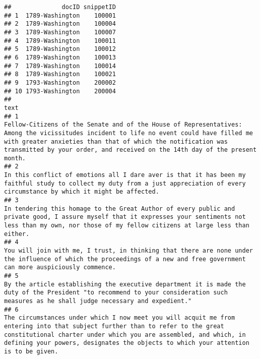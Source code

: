 \documentclass[]{article}
\begin{document}
\begin{verbatim}
##              docID snippetID
## 1  1789-Washington    100001
## 2  1789-Washington    100004
## 3  1789-Washington    100007
## 4  1789-Washington    100011
## 5  1789-Washington    100012
## 6  1789-Washington    100013
## 7  1789-Washington    100014
## 8  1789-Washington    100021
## 9  1793-Washington    200002
## 10 1793-Washington    200004
##                                                                                                                                                                                                                                                                                                                                                           text
## 1                                                                       Fellow-Citizens of the Senate and of the House of Representatives:  Among the vicissitudes incident to life no event could have filled me with greater anxieties than that of which the notification was transmitted by your order, and received on the 14th day of the present month.
## 2                                                                                                                                                                          In this conflict of emotions all I dare aver is that it has been my faithful study to collect my duty from a just appreciation of every circumstance by which it might be affected.
## 3                                                                                                                                            In tendering this homage to the Great Author of every public and private good, I assure myself that it expresses your sentiments not less than my own, nor those of my fellow citizens at large less than either.
## 4                                                                                                                                                                                    You will join with me, I trust, in thinking that there are none under the influence of which the proceedings of a new and free government can more auspiciously commence.
## 5                                                                                                                                                                      By the article establishing the executive department it is made the duty of the President "to recommend to your consideration such measures as he shall judge necessary and expedient."
## 6                                                                      The circumstances under which I now meet you will acquit me from entering into that subject further than to refer to the great constitutional charter under which you are assembled, and which, in defining your powers, designates the objects to which your attention is to be given.

\end{verbatim}
\end{document}
